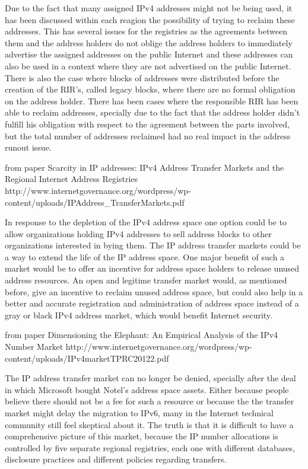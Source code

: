 \documentclass[11pt,a4paper]{scrreprt}
\begin{document}
Due to the fact that many assigned IPv4 addresses might not be being used, it has been discussed within each reagion the possibility of trying to reclaim these addresses. This has several issues for the registries as the agreements between them and the address holders do not oblige the address holders to immediately advertise the assigned addresses on the public Internet and these addresses can also be used in a context where they are not advertised on the public Internet. There is also the case where blocks of addresses were distributed before the creation of the RIR's, called legacy blocks, where there are no formal obligation on the address holder. There has been cases where the responsible RIR has been able to reclaim addresses, specially due to the fact that the address holder didn't fulfill his obligation with respect to the agreement between the parts involved, but the total number of addresses reclaimed had no real impact in the address runout issue.

from paper Scarcity in IP addresses: IPv4 Address Transfer Markets and the Regional Internet Address Registries http://www.internetgovernance.org/wordpress/wp-content/uploads/IPAddress\_TransferMarkets.pdf

In response to the depletion of the IPv4 address space one option could be to allow organizations holding IPv4 addresses to sell address blocks to other organizations interested in bying them. The IP address transfer markets could be a way to extend the life of the IP address space. One major benefit of such a market would be to offer an incentive for address space holders to release unused address resources. An open and legitime transfer market would, as mentioned before, give an incentive to reclaim unused address space, but could also help in a better and accurate registration and administration of address space instead of a gray or black IPv4 address market, which would benefit Internet security.  

from paper Dimensioning the Elephant: An Empirical Analysis of the IPv4 Number Market http://www.internetgovernance.org/wordpress/wp-content/uploads/IPv4marketTPRC20122.pdf

The IP address transfer market can no longer be denied, specially after the deal in which Microsoft bought Notel's address space assets. Either because people believe there should not be a fee for such a resource or because the the transfer market might delay the migration to IPv6, many in the Internet technical community still feel skeptical about it. The truth is that it is difficult to have a comprehensive picture of this market, because the IP number allocations is controlled by five separate regional registries, each one with different databases, disclosure practices and different policies regarding transfers. 
\end{document}

